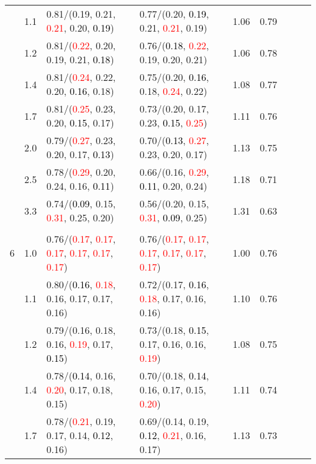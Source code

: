 \documentclass[10pt,a4paper]{report}
\begin{document}
\begin{table}[!htbp]
\begin{center}
{\begin{tabular}{ccllccccc}
			&1.1&0.81/(0.19, 0.21, \textcolor{red}{0.21}, 0.20, \textcolor{black}{0.19})&0.77/(0.20, \textcolor{black}{0.19}, 0.21, \textcolor{red}{0.21}, 0.19)&1.06&0.79\\
			&1.2&0.81/(\textcolor{red}{0.22}, 0.20, 0.19, 0.21, \textcolor{black}{0.18})&0.76/(\textcolor{black}{0.18}, \textcolor{red}{0.22}, 0.19, 0.20, 0.21)&1.06&0.78\\
			&1.4&0.81/(\textcolor{red}{0.24}, 0.22, 0.20, \textcolor{black}{0.16}, 0.18)&0.75/(0.20, \textcolor{black}{0.16}, 0.18, \textcolor{red}{0.24}, 0.22)&1.08&0.77\\
			&1.7&0.81/(\textcolor{red}{0.25}, 0.23, 0.20, \textcolor{black}{0.15}, 0.17)&0.73/(0.20, 0.17, 0.23, \textcolor{black}{0.15}, \textcolor{red}{0.25})&1.11&0.76\\
			&2.0&0.79/(\textcolor{red}{0.27}, 0.23, 0.20, 0.17, \textcolor{black}{0.13})&0.70/(\textcolor{black}{0.13}, \textcolor{red}{0.27}, 0.23, 0.20, 0.17)&1.13&0.75\\
			&2.5&0.78/(\textcolor{red}{0.29}, 0.20, 0.24, 0.16, \textcolor{black}{0.11})&0.66/(0.16, \textcolor{red}{0.29}, \textcolor{black}{0.11}, 0.20, 0.24)&1.18&0.71\\
			&3.3&0.74/(\textcolor{black}{0.09}, 0.15, \textcolor{red}{0.31}, 0.25, 0.20)&0.56/(0.20, 0.15, \textcolor{red}{0.31}, \textcolor{black}{0.09}, 0.25)&1.31&0.63\\
			&&&&\\
			6			&1.0&0.76/(\textcolor{red}{0.17}, \textcolor{red}{0.17}, \textcolor{red}{0.17}, \textcolor{red}{0.17}, \textcolor{red}{0.17}, \textcolor{red}{0.17})&0.76/(\textcolor{red}{0.17}, \textcolor{red}{0.17}, \textcolor{red}{0.17}, \textcolor{red}{0.17}, \textcolor{red}{0.17}, \textcolor{red}{0.17})&1.00&0.76\\
			&1.1&0.80/(\textcolor{black}{0.16}, \textcolor{red}{0.18}, 0.16, 0.17, 0.17, 0.16)&0.72/(0.17, \textcolor{black}{0.16}, \textcolor{red}{0.18}, 0.17, 0.16, 0.16)&1.10&0.76\\
			&1.2&0.79/(0.16, 0.18, 0.16, \textcolor{red}{0.19}, 0.17, \textcolor{black}{0.15})&0.73/(0.18, \textcolor{black}{0.15}, 0.17, 0.16, 0.16, \textcolor{red}{0.19})&1.08&0.75\\
			&1.4&0.78/(\textcolor{black}{0.14}, 0.16, \textcolor{red}{0.20}, 0.17, 0.18, 0.15)&0.70/(0.18, \textcolor{black}{0.14}, 0.16, 0.17, 0.15, \textcolor{red}{0.20})&1.11&0.74\\
			&1.7&0.78/(\textcolor{red}{0.21}, 0.19, 0.17, 0.14, \textcolor{black}{0.12}, 0.16)&0.69/(0.14, 0.19, \textcolor{black}{0.12}, \textcolor{red}{0.21}, 0.16, 0.17)&1.13&0.73\\

\end{tabular}}
\end{center}
\end{table}
\end{document}
